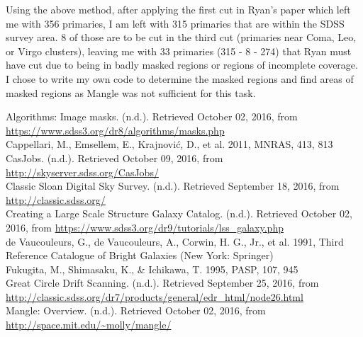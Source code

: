 \documentclass[10pt,letterpaper]{article}
\begin{document}
Using the above method, after applying the first cut in Ryan's paper which left me with 356 primaries, I am left with 315 primaries that are within the SDSS survey area. 8 of those are to be cut in the third cut (primaries near Coma, Leo, or Virgo clusters), leaving me with 33 primaries (315 - 8 - 274) that Ryan must have cut due to being in badly masked regions or regions of incomplete coverage.\\

I chose to write my own code to determine the masked regions and find areas of masked regions as Mangle \cite{mangle} was not sufficient for this task.\\

\newpage
\center
\begin{thebibliography}{1}
 Algorithms: Image masks. (n.d.). Retrieved October 02, 2016, from \url{https://www.sdss3.org/dr8/algorithms/masks.php}\\

 Cappellari, M., Emsellem, E., Krajnovi\'c, D., et al. 2011, MNRAS, 413, 813\\

CasJobs. (n.d.). Retrieved October 09, 2016, from \url{http://skyserver.sdss.org/CasJobs/}\\


 Classic Sloan Digital Sky Survey. (n.d.). Retrieved September 18, 2016, from \url{http://classic.sdss.org/}\\

 Creating a Large Scale Structure Galaxy Catalog. (n.d.). Retrieved October 02, 2016, from \url{https://www.sdss3.org/dr9/tutorials/lss_galaxy.php}\\

 de Vaucouleurs, G., de Vaucouleurs, A., Corwin, H. G., Jr., et al. 1991, Third
Reference Catalogue of Bright Galaxies (New York: Springer)\\

 Fukugita, M., Shimasaku, K., \& Ichikawa, T. 1995, PASP, 107, 945\\

 Great Circle Drift Scanning. (n.d.). Retrieved September 25, 2016, from \url{http://classic.sdss.org/dr7/products/general/edr_html/node26.html}\\

 Mangle: Overview. (n.d.). Retrieved October 02, 2016, from \url{http://space.mit.edu/~molly/mangle/}\\


\end{thebibliography}
\end{document}
